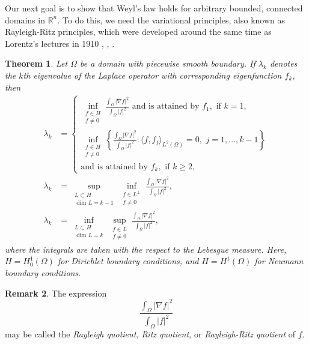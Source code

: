 \documentclass{amsart}
\newtheorem{theorem}{Theorem}[section]
\theoremstyle{definition}
\newtheorem{remark}[theorem]{Remark}
\newcommand*{\R}{\mathbb{R}}
\begin{document}
Our next goal is to show that Weyl's law holds for arbitrary bounded, connected domains in $\R^n$. To do this, we need the variational principles, also known as Rayleigh-Ritz principles, which were developed around the same time as Lorentz's lectures in 1910 \cite{leissa}, \cite{Rayleigh2011}, \cite{Ritz1909}.



\begin{theorem} \label{Theorem:Variational_principles} %
    Let $\Omega$ be a domain with piecewise smooth boundary. If $\lambda_k$ denotes the $k$th eigenvalue of the Laplace operator with corresponding eigenfunction $f_k$, then
    \begin{align}
        \lambda_k &= 
        \begin{cases}
            \inf_{\substack{f \in H \\ f \neq 0}} \frac{\int_\Omega |\nabla f|^2}{\int_\Omega |f|^2} \text{ and is attained by } f_1, \text{ if } k = 1, \\
            \inf_{\substack{f \in H \\ f \neq 0}}  \left\{\frac{\int_\Omega |\nabla f|^2}{\int_\Omega |f|^2} : \langle f, f_j \rangle_{L^2(\Omega)} = 0, \,\,j = 1,\dots, k-1 \right\} \\\text{and is attained by } f_k, \text{ if } k \geq 2,
        \end{cases} \label{eq:variational_principle1}
        \\
        \lambda_k &= \sup_{\substack{L \subset H \\ \text{ dim } L = k-1}} \inf_{\substack{f \in L^{\perp} \\ f \neq 0}} \frac{\int_\Omega |\nabla f|^2}{\int_\Omega |f|^2}, \label{eq:variational_principle2}\\
        \lambda_k &= \inf_{\substack{L \subset H \\ \text{ dim } L = k}} \sup_{\substack{f \in L \\ f \neq 0}} \frac{\int_\Omega |\nabla f|^2}{\int_\Omega |f|^2}, \label{eq:variational_principle3}
    \end{align}
    where the integrals are taken with the respect to the Lebesgue measure. Here, $H = H_0^1(\Omega)$ for Dirichlet boundary conditions, and $H = H^1(\Omega)$ for Neumann boundary conditions. 
\end{theorem}
\begin{remark}
    The expression 
    \begin{equation*}
        \frac{\int_\Omega |\nabla f|^2}{\int_\Omega |f|^2}
    \end{equation*}
    may be called the \textit{Rayleigh quotient,} \textit{Ritz quotient,} or \textit{Rayleigh-Ritz quotient} of $f$. 
\end{remark}
\end{document}
